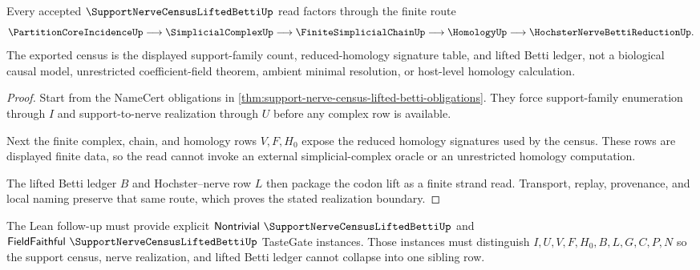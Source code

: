 \begin{theorem}
\label{thm:support-nerve-census-lifted-betti-realization}
Every accepted $\SupportNerveCensusLiftedBettiUp$ read factors through the finite route
$$
\PartitionCoreIncidenceUp
\longrightarrow
\SimplicialComplexUp
\longrightarrow
\FiniteSimplicialChainUp
\longrightarrow
\HomologyUp
\longrightarrow
\HochsterNerveBettiReductionUp .
$$
The exported census is the displayed support-family count, reduced-homology signature table, and lifted Betti ledger, not a biological causal model, unrestricted coefficient-field theorem, ambient minimal resolution, or host-level homology calculation.
\end{theorem}
\begin{proof}
Start from the NameCert obligations in \autoref{thm:support-nerve-census-lifted-betti-obligations}. They force support-family enumeration through $I$ and support-to-nerve realization through $U$ before any complex row is available.

Next the finite complex, chain, and homology rows $V,F,H_0$ expose the reduced homology signatures used by the census. These rows are displayed finite data, so the read cannot invoke an external simplicial-complex oracle or an unrestricted homology computation.

The lifted Betti ledger $B$ and Hochster--nerve row $L$ then package the codon lift as a finite strand read. Transport, replay, provenance, and local naming preserve that same route, which proves the stated realization boundary.
\end{proof}



The Lean follow-up must provide explicit $\mathsf{Nontrivial}\ \SupportNerveCensusLiftedBettiUp$ and $\mathsf{FieldFaithful}\ \SupportNerveCensusLiftedBettiUp$ TasteGate instances. Those instances must distinguish $I,U,V,F,H_0,B,L,G,C,P,N$ so the support census, nerve realization, and lifted Betti ledger cannot collapse into one sibling row.

